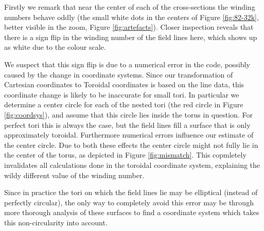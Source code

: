 \documentclass[a4paper]{article}
\begin{document}
Firstly we remark that near the center of each of the cross-sections the winding numbers behave oddly (the small white dots in the centers of Figure \ref{fig:82-32k}, better visible in the zoom, Figure \ref{fig:artefacts}).
Closer inspection reveals that there is a sign flip in the winding number of the field lines here, which shows up as white due to the colour scale. 

We suspect that this sign flip is due to a numerical error in the code, possibly caused by the change in coordinate systems. 
Since our transformation of Cartesian coordinates to Toroidal coordinates is based on the line data, this coordinate change is likely to be inaccurate for small tori. 
In particular we determine a center circle for each of the nested tori (the red circle in Figure \ref{fig:coordsys}), and assume that this circle lies inside the torus in question. For perfect tori this is always the case, but the field lines fill a surface that is only approximately toroidal. Furthermore numerical errors influence our estimate of the center circle. Due to both these effects the center circle might not fully lie in the center of the torus, as depicted in Figure \ref{fig:mismatch}. This copmletely invalidates all calculations done in the toroidal coordinate system, explaining the wildy different value of the winding number.

Since in practice the tori on which the field lines lie may be elliptical (instead of perfectly circular), the only way to completely avoid this error may be through more thorough analysis of these surfaces to find a coordinate system which takes this non-circularity into account.
\end{document}
